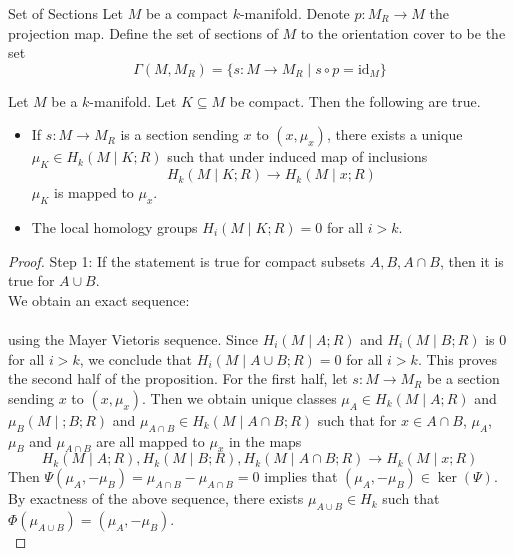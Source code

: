 \documentclass[a4paper]{article}
\begin{document}
\begin{defn}{Set of Sections}{} Let $M$ be a compact $k$-manifold. Denote $p:M_R\to M$ the projection map. Define the set of sections of $M$ to the orientation cover to be the set $$\Gamma(M,M_R)=\{s:M\to M_R\;|\;s\circ p=\text{id}_M\}$$
\end{defn}

\begin{prp}{}{} Let $M$ be a $k$-manifold. Let $K\subseteq M$ be compact. Then the following are true. 
\begin{itemize}
\item If $s:M\to M_R$ is a section sending $x$ to $(x,\mu_x)$, there exists a unique $\mu_K\in H_k(M\;|\;K;R)$ such that under induced map of inclusions $$H_k(M\;|\;K;R)\to H_k(M\;|\;x;R)$$ $\mu_K$ is mapped to $\mu_x$. 
\item The local homology groups $H_i(M\;|\;K;R)=0$ for all $i>k$. 
\end{itemize} 
\begin{proof}
Step 1: If the statement is true for compact subsets $A,B,A\cap B$, then it is true for $A\cup B$. \\
We obtain an exact sequence: \\
\\
using the Mayer Vietoris sequence. Since $H_i(M\;|\;A;R)$ and $H_i(M\;|\;B;R)$ is $0$ for all $i>k$, we conclude that $H_i(M\;|\;A\cup B;R)=0$ for all $i>k$. This proves the second half of the proposition. For the first half, let $s:M\to M_R$ be a section sending $x$ to $(x,\mu_x)$. Then we obtain unique classes $\mu_A\in H_k(M\;|\;A;R)$ and $\mu_B(M\;|\;;B;R)$ and $\mu_{A\cap B}\in H_k(M\;|\;A\cap B;R)$ such that for $x\in A\cap B$, $\mu_A$, $\mu_B$ and $\mu_{A\cap B}$ are all mapped to $\mu_x$ in the maps $$H_k(M\;|\;A;R),H_k(M\;|\;B;R),H_k(M\;|\;A\cap B;R)\to H_k(M\;|\;x;R)$$ Then $\Psi(\mu_A,-\mu_B)=\mu_{A\cap B}-\mu_{A\cap B}=0$ implies that $(\mu_A,-\mu_B)\in\ker(\Psi)$. By exactness of the above sequence, there exists $\mu_{A\cup B}\in H_k$ such that $\Phi(\mu_{A\cup B})=(\mu_A,-\mu_B)$. \\


\end{proof}
\end{prp}
\end{document}
